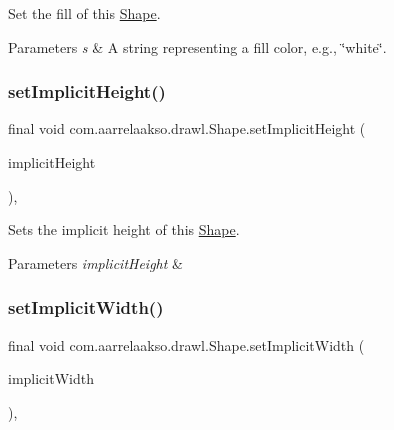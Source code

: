 Set the fill of this \hyperlink{classcom_1_1aarrelaakso_1_1drawl_1_1_shape}{Shape}. 


\begin{DoxyParams}{Parameters}
{\em s} & A string representing a fill color, e.\+g., \char`\"{}white\char`\"{}. \\
\hline
\end{DoxyParams}
\mbox{\label{classcom_1_1aarrelaakso_1_1drawl_1_1_shape_a608e72be0fb16380e5fda14564c46739}} 
\subsubsection{\texorpdfstring{set\+Implicit\+Height()}{setImplicitHeight()}}
{\footnotesize\ttfamily final void com.\+aarrelaakso.\+drawl.\+Shape.\+set\+Implicit\+Height (\begin{DoxyParamCaption}\item[{@Not\+Null final \hyperlink{interfacecom_1_1aarrelaakso_1_1drawl_1_1_number}{Number}}]{implicit\+Height }\end{DoxyParamCaption})\hspace{0.3cm}{\ttfamily [protected]}, {\ttfamily [inherited]}}



Sets the implicit height of this \hyperlink{classcom_1_1aarrelaakso_1_1drawl_1_1_shape}{Shape}. 


\begin{DoxyParams}{Parameters}
{\em implicit\+Height} & \\
\hline
\end{DoxyParams}
\mbox{\label{classcom_1_1aarrelaakso_1_1drawl_1_1_shape_acc3e365064b5d4f719ac920a5a70aedb}} 
\subsubsection{\texorpdfstring{set\+Implicit\+Width()}{setImplicitWidth()}}
{\footnotesize\ttfamily final void com.\+aarrelaakso.\+drawl.\+Shape.\+set\+Implicit\+Width (\begin{DoxyParamCaption}\item[{@Not\+Null final \hyperlink{interfacecom_1_1aarrelaakso_1_1drawl_1_1_number}{Number}}]{implicit\+Width }\end{DoxyParamCaption})\hspace{0.3cm}{\ttfamily [protected]}, {\ttfamily [inherited]}}



